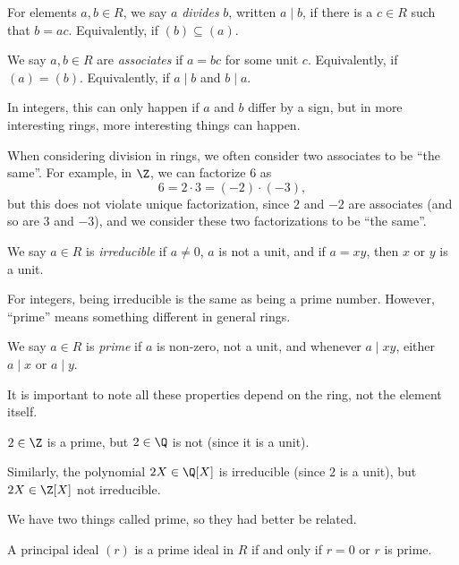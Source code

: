 \documentclass[a4paper]{article}
\begin{document}
\begin{defi}[Division]
  For elements $a, b \in R$, we say $a$ \emph{divides} $b$, written $a \mid b$, if there is a $c \in R$ such that $b = ac$. Equivalently, if $(b) \subseteq (a)$.
\end{defi}

\begin{defi}[Associates]
  We say $a, b \in R$ are \emph{associates} if $a = bc$ for some unit $c$. Equivalently, if $(a) = (b)$. Equivalently, if $a \mid b$ and $b \mid a$.
\end{defi}
In integers, this can only happen if $a$ and $b$ differ by a sign, but in more interesting rings, more interesting things can happen.

When considering division in rings, we often consider two associates to be ``the same''. For example, in $\Z$, we can factorize $6$ as
\[
  6 = 2 \cdot 3 = (-2) \cdot (-3),
\]
but this does not violate unique factorization, since $2$ and $-2$ are associates (and so are $3$ and $-3$), and we consider these two factorizations to be ``the same''.

\begin{defi}[Irreducible]
  We say $a \in R$ is \emph{irreducible} if $a \not = 0$, $a$ is not a unit, and if $a = xy$, then $x$ or $y$ is a unit.
\end{defi}
For integers, being irreducible is the same as being a prime number. However, ``prime'' means something different in general rings.

\begin{defi}[Prime]
  We say $a \in R$ is \emph{prime} if $a$ is non-zero, not a unit, and whenever $a \mid xy$, either $a \mid x$ or $a \mid y$.
\end{defi}
It is important to note all these properties depend on the ring, not the element itself.
\begin{eg}
  $2 \in \Z$ is a prime, but $2 \in \Q$ is not (since it is a unit).

  Similarly, the polynomial $2X \in \Q[X]$ is irreducible (since $2$ is a unit), but $2X \in \Z[X]$ not irreducible.
\end{eg}

We have two things called prime, so they had better be related.
\begin{lemma}
  A principal ideal $(r)$ is a prime ideal in $R$ if and only if $r = 0$ or $r$ is prime.
\end{lemma}
\end{document}
